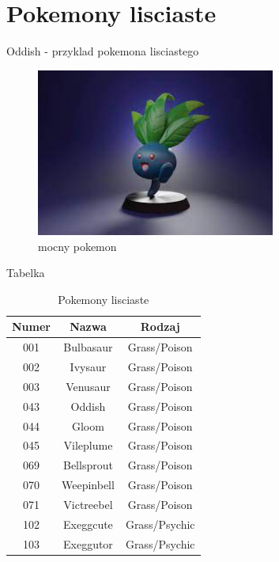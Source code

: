 \documentclass{beamer}
\begin{document}
\section{Pokemony lisciaste}

\begin{frame}{Oddish - przyklad pokemona lisciastego}
  \begin{figure}
    \centering
    \includegraphics[width=0.7\textwidth]{oddish.jpg}
    \caption{mocny pokemon}
    \label{fig:oddish.jpg}
  \end{figure}
\end{frame}

\begin{frame}{Tabelka}
  \begin{table}
    \centering
    \begin{tabular}{|c|c|c|}
    \hline
    \textbf{Numer} & \textbf{Nazwa} & \textbf{Rodzaj} \\
    \hline
    001 & Bulbasaur & Grass/Poison \\
    002 & Ivysaur & Grass/Poison \\
    003 & Venusaur & Grass/Poison \\
    043 & Oddish & Grass/Poison \\
    044 & Gloom & Grass/Poison \\
    045 & Vileplume & Grass/Poison \\
    069 & Bellsprout & Grass/Poison \\
    070 & Weepinbell & Grass/Poison \\
    071 & Victreebel & Grass/Poison \\
    102 & Exeggcute & Grass/Psychic \\
    103 & Exeggutor & Grass/Psychic \\
    \hline
  \end{tabular}
  \caption{Pokemony lisciaste}
    \label{tab:tabela1}
  \end{table}
\end{frame}
\end{document}
